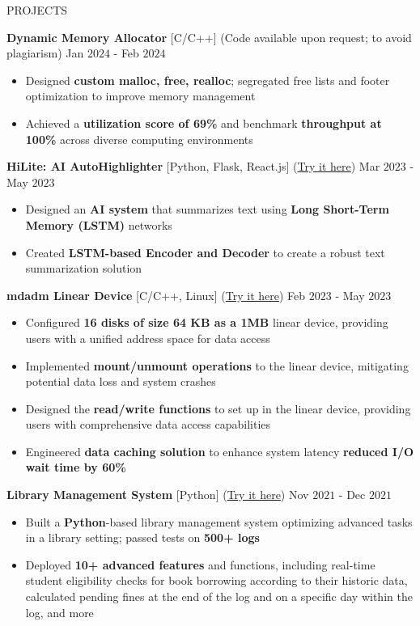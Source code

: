 \documentclass{resume} %
\begin{document}
\begin{rSection}{PROJECTS}

{\bf Dynamic Memory Allocator }{[C/C++] }{(Code available upon request; to avoid plagiarism)} \hfill Jan $2024$ - Feb $2024$
\begin{itemize}[itemsep = -4pt]
    \item Designed {\bf custom malloc, free, realloc}; segregated free lists and footer optimization to improve memory management
    \item Achieved a {\bf utilization score of 69\%} and benchmark {\bf throughput at 100\%} across diverse computing environments
\end{itemize}

{\bf HiLite: AI AutoHighlighter }{[Python, Flask, React.js] }{(\href{https://github.com/harshitjain17/HiLite-AIAutoHighlighter}{Try it here})} \hfill Mar $2023$ - May $2023$
\begin{itemize}[itemsep = -4pt]
    \item Designed an {\bf AI system} that summarizes text using {\bf Long Short-Term Memory (LSTM)} networks
    \item Created {\bf LSTM-based Encoder and Decoder} to create a robust text summarization solution
\end{itemize}

{\bf mdadm Linear Device }{[C/C++, Linux] }{(\href{https://github.com/harshitjain17/mdadm-Linear-Device}{Try it here})} \hfill Feb $2023$ - May $2023$
\begin{itemize}[itemsep = -4pt]
    \item Configured {\bf 16 disks of size 64 KB as a 1MB} linear device, providing users with a unified address space for data access
    \item Implemented {\bf mount/unmount operations} to the linear device, mitigating potential data loss and system crashes
    \item Designed the {\bf read/write functions} to set up in the linear device, providing users with comprehensive data access capabilities
    \item Engineered {\bf data caching solution} to enhance system latency {\bf reduced I/O wait time by 60\%}
\end{itemize}

{\bf Library Management System }{[Python] }{(\href{https://github.com/harshitjain17/Library-Management-System}{Try it here})} \hfill Nov $2021$ - Dec $2021$
\begin{itemize}[itemsep = -4pt]
    \item Built a {\bf Python}-based library management system optimizing advanced tasks in a library setting; passed tests on {\bf 500+ logs}
    \item Deployed {\bf 10+ advanced features} and functions, including real-time student eligibility checks for book borrowing according to their historic data, calculated pending fines at the end of the log and on a specific day within the log, and more
\end{itemize}

\end{rSection}
\end{document}
